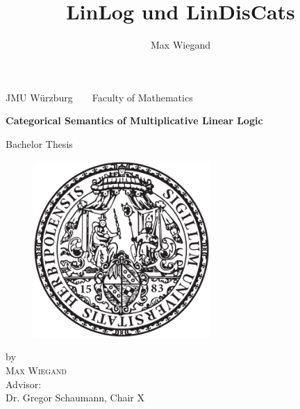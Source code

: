 \documentclass[DIN, pagenumber=false, fontsize=11pt, parskip=half, colorinlistoftodos, svgnames]{scrartcl}
\title{LinLog und LinDisCats}
\author{Max Wiegand}
\begin{document}
	\thispagestyle{empty}
	
	\begin{center}
		{\large
			JMU Würzburg\  \ \textbullet\ \ Faculty of Mathematics
		}
		\vfil
		
		{\bfseries\huge Categorical Semantics of Multiplicative Linear Logic\\}
		
		\vfil
		\vspace{0.75cm}
		
		{\LARGE
			Bachelor Thesis
		}
		\\
		
		\begin{figure}[h!]
			\centering
			\vspace*{0.75cm}
			\includegraphics[width=0.6\textwidth]{unisiegel.png}
			\vspace*{.75cm}
		\end{figure}
		
		
		by\\[\bigskipamount]
		\textsc{Max Wiegand}\\[\bigskipamount]
		\vspace{2cm}
		Advisor:\\ \bigskip
		Dr. Gregor Schaumann, Chair X
	\end{center}
	
	\newpage\null\thispagestyle{empty}\newpage
	
	\tableofcontents
	\newpage
	
	
\end{document}
